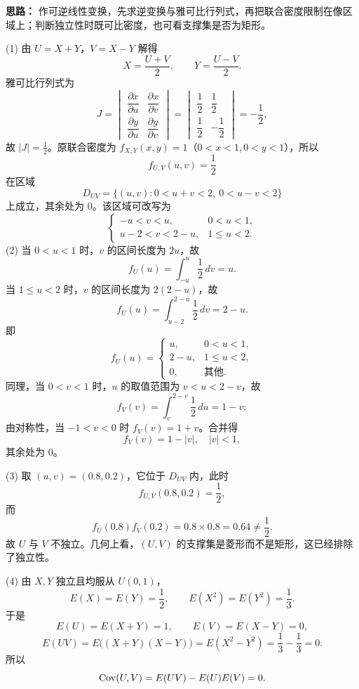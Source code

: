 \ifshowsolutions%
\textbf{思路：} 作可逆线性变换，先求逆变换与雅可比行列式，再把联合密度限制在像区域上；判断独立性时既可比密度，也可看支撑集是否为矩形。

(1) 由 $U=X+Y$，$V=X-Y$ 解得
\[
X=\frac{U+V}{2},\qquad Y=\frac{U-V}{2}.
\]
雅可比行列式为
\[
J=\begin{vmatrix}
\dfrac{\partial x}{\partial u} & \dfrac{\partial x}{\partial v}\\[8pt]
\dfrac{\partial y}{\partial u} & \dfrac{\partial y}{\partial v}
\end{vmatrix}
=\begin{vmatrix}
\dfrac12 & \dfrac12\\[8pt]
\dfrac12 & -\dfrac12
\end{vmatrix}
=-\frac12,
\]
故 $|J|=\frac12$。原联合密度为 $f_{X,Y}(x,y)=1$（$0<x<1,0<y<1$），所以
\[
f_{U,V}(u,v)=\frac12
\]
在区域
\[
D_{UV}=\{(u,v):0<u+v<2,\ 0<u-v<2\}
\]
上成立，其余处为 $0$。该区域可改写为
\[
\begin{cases}
-u<v<u, & 0<u<1,\\
u-2<v<2-u, & 1\leq u<2.
\end{cases}
\]
(2) 当 $0<u<1$ 时，$v$ 的区间长度为 $2u$，故
\[
f_U(u)=\int_{-u}^{u}\frac12\,dv=u.
\]
当 $1\leq u<2$ 时，$v$ 的区间长度为 $2(2-u)$，故
\[
f_U(u)=\int_{u-2}^{2-u}\frac12\,dv=2-u.
\]
即
\[
f_U(u)=\begin{cases}
u, & 0<u<1,\\
2-u, & 1\leq u<2,\\
0, & \text{其他}.
\end{cases}
\]
同理，当 $0<v<1$ 时，$u$ 的取值范围为 $v<u<2-v$，故
\[
f_V(v)=\int_{v}^{2-v}\frac12\,du=1-v;
\]
由对称性，当 $-1<v<0$ 时 $f_V(v)=1+v$。合并得
\[
f_V(v)=1-|v|,\quad |v|<1,
\]
其余处为 $0$。

(3) 取 $(u,v)=(0.8,0.2)$，它位于 $D_{UV}$ 内，此时
\[
f_{U,V}(0.8,0.2)=\frac12,
\]
而
\[
f_U(0.8)f_V(0.2)=0.8\times0.8=0.64\neq\frac12.
\]
故 $U$ 与 $V$ 不独立。几何上看，$(U,V)$ 的支撑集是菱形而不是矩形，这已经排除了独立性。

(4) 由 $X,Y$ 独立且均服从 $U(0,1)$，
\[
E(X)=E(Y)=\frac12,\qquad E(X^2)=E(Y^2)=\frac13.
\]
于是
\[
E(U)=E(X+Y)=1,\qquad E(V)=E(X-Y)=0,
\]
\[
E(UV)=E\bigl((X+Y)(X-Y)\bigr)=E(X^2-Y^2)=\frac13-\frac13=0.
\]
所以
\[
\operatorname{Cov}(U,V)=E(UV)-E(U)E(V)=0.
\]

